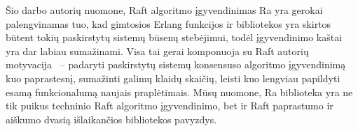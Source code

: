 \documentclass{VUMIFPSkursinis}
\begin{document}
Šio darbo autorių nuomone, Raft algoritmo įgyvendinimas Ra yra gerokai palengvinamas tuo, kad gimtosios Erlang funkcijos ir bibliotekos yra skirtos būtent tokių paskirstytų sistemų būsenų stebėjimui, todėl įgyvendinimo kaštai yra dar labiau sumažinami. Visa tai gerai komponuoja su Raft autorių motyvacija~\cite{ongaro_consensus} -- padaryti paskirstytų sistemų konsensuso algoritmo įgyvendinimą kuo paprastesnį, sumažinti galimų klaidų skaičių, leisti kuo lengviau papildyti esamą funkcionalumą naujais praplėtimais. Mūsų nuomone, Ra biblioteka yra ne tik puikus techninio Raft algoritmo įgyvendinimo, bet ir Raft paprastumo ir aiškumo dvasią išlaikančios bibliotekos pavyzdys. 


\printbibliography[heading=bibintoc]  %


\appendix  %







\end{document}
